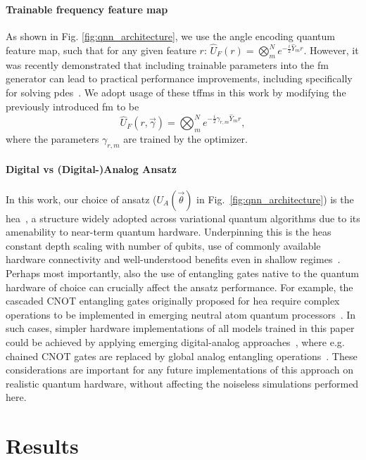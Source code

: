 \documentclass[aps,pra,a4paper,twocolumn,longbibliography,groupedaddress]{revtex4-2}
\begin{document}
\paragraph{Trainable frequency feature map}
As shown in Fig. \ref{fig:qnn_architecture}, we use the angle encoding quantum feature map, such that for any given feature $r$: $\hat{U}_F(r) = \bigotimes_{m}^N e^{-\frac{i}{2}\hat{Y}_m r}$. However, it was recently demonstrated that including trainable parameters into the \gls{fm} generator can lead to practical performance improvements, including specifically for solving \gls{pde}s~\cite{jaderberg2023let}. We adopt usage of these \glspl{tffm} in this work by modifying the previously introduced \gls{fm} to be
\begin{equation}
\hat{U}_F(r, \vec{\gamma}) = \bigotimes_{m}^N e^{-\frac{i}{2}\gamma_{r,m}\hat{Y}_m r},
\end{equation}
where the parameters $\gamma_{r,m}$ are trained by the optimizer.

\paragraph{Digital vs (Digital-)Analog Ansatz}
{
In this work, our choice of ansatz ($U_A(\vec{\theta})$ in Fig.~\ref{fig:qnn_architecture}) is the \gls{hea}~\cite{kandala2017hardware}, a structure widely adopted across variational quantum algorithms due to its amenability to near-term quantum hardware. Underpinning this is the \gls{hea}s constant depth scaling with number of qubits, use of commonly available hardware connectivity and well-understood benefits even in shallow regimes~\cite{leone2022practicalHEA}. 
Perhaps most importantly, also the use of entangling gates native to the quantum hardware of choice can crucially affect the ansatz performance. For example, the cascaded CNOT entangling gates originally proposed for \gls{hea} require complex operations to be implemented in emerging neutral atom quantum processors~\cite{bluvstein2023logical}. 
In such cases, simpler hardware implementations of all models trained in this paper could be achieved by applying emerging digital-analog approaches~\cite{parra2020digital, michel2023blueprint}, where e.g. chained CNOT gates are replaced by global analog entangling operations~\cite{digitalanalog2022}. 
} 
These considerations are important for any future implementations of this approach on realistic quantum hardware, without affecting the noiseless simulations performed here. 

\section{Results}\label{sec:results}
\end{document}

